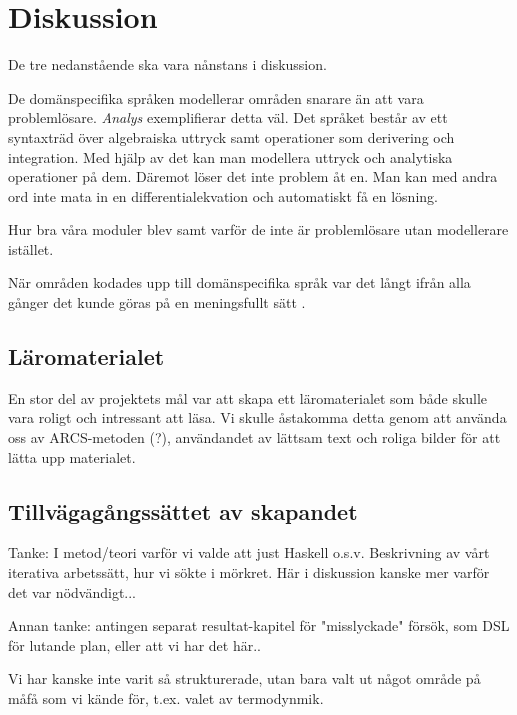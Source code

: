 
\chapter{Diskussion}

\begin{binge}
De tre nedanstående ska vara nånstans i diskussion.

De domänspecifika språken modellerar områden snarare än att vara problemlösare.
\textit{Analys} exemplifierar detta väl. Det språket består av ett syntaxträd
över algebraiska uttryck samt operationer som derivering och integration. Med
hjälp av det kan man modellera uttryck och analytiska operationer på dem.
Däremot löser det inte problem åt en. Man kan med andra ord inte mata in en
differentialekvation och automatiskt få en lösning.

Hur bra våra moduler blev samt varför de inte är problemlösare utan modellerare istället.

När områden kodades upp till domänspecifika språk var det långt ifrån alla gånger
det kunde göras på en meningsfullt sätt .

\section{Läromaterialet}

En stor del av projektets mål var att skapa ett läromaterialet som både skulle
vara roligt och intressant att läsa. Vi skulle åstakomma detta genom att använda
oss av ARCS-metoden (?), användandet av lättsam text och roliga bilder för att
lätta upp materialet. 

\section{Tillvägagångssättet av skapandet}

Tanke: I metod/teori varför vi valde att just Haskell o.s.v. Beskrivning av
vårt iterativa arbetssätt, hur vi sökte i mörkret. Här i diskussion kanske mer
varför det var nödvändigt...

Annan tanke: antingen separat resultat-kapitel för "misslyckade" försök, som
DSL för lutande plan, eller att vi har det här..

Vi har kanske inte varit så strukturerade, utan bara valt ut något område på
måfå som vi kände för, t.ex. valet av termodynmik.


\end{binge}
